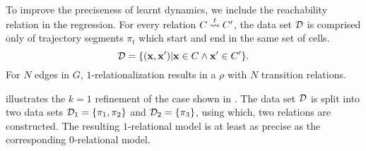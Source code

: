 
To improve the preciseness of learnt dynamics, we include the
reachability relation in the
regression. For every relation $C\overset{t}{\rightsquigarrow}C'$, the data set $\mathcal{D}$ is
comprised only of trajectory segments $\pi_t$ which start and end in
the same set of cells.
\[
    \mathcal{D} = \{(\mathbf{x},\mathbf{x}') | \mathbf{x} \in C \land \mathbf{x}' \in C'\}.
\]
For $N$ edges in $G$, $1$-relationalization results in a $\rho$ with
$N$ transition relations.

 illustrates the $k=1$ refinement of the case shown in
. The data set $\mathcal{D}$ is split into two data sets $\mathcal{D}_1
= \{\pi_1, \pi_2\}$ and $\mathcal{D}_2 = \{\pi_3\}$, using which, two
relations are constructed. The resulting $1$-relational model
is at least as precise as the corresponding $0$-relational model.


